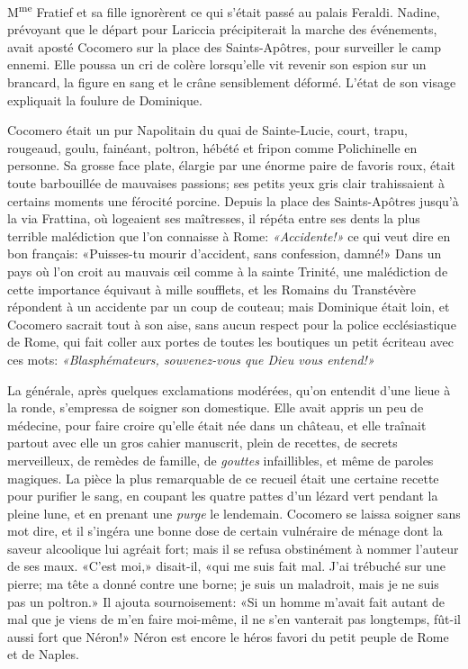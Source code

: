
M\textsuperscript{me} Fratief et sa fille ignorèrent ce qui s'était
passé au palais Feraldi. Nadine, prévoyant que le départ pour Lariccia
précipiterait la marche des événements, avait aposté Cocomero sur la
place des Saints-Apôtres, pour surveiller le camp ennemi. Elle poussa un
cri de colère lorsqu'elle vit revenir son espion sur un brancard, la
figure en sang et le crâne sensiblement déformé. L'état de son visage
expliquait la foulure de Dominique.

Cocomero était un pur Napolitain du quai de Sainte-Lucie, court, trapu,
rougeaud, goulu, fainéant, poltron, hébété et fripon comme Polichinelle
en personne. Sa grosse face plate, élargie par une énorme paire de
favoris roux, était toute barbouillée de mauvaises passions; ses petits
yeux gris clair trahissaient à certains moments une férocité porcine.
Depuis la place des Saints-Apôtres jusqu'à la via Frattina, où logeaient
ses maîtresses, il répéta entre ses dents la plus terrible malédiction
que l'on connaisse à Rome: \emph{«Accidente!»} ce qui veut dire en bon
français: «Puisses-tu mourir d'accident, sans confession, damné!» Dans
un pays où l'on croit au mauvais œil comme à la sainte Trinité, une
malédiction de cette importance équivaut à mille soufflets, et les
Romains du Transtévère répondent à un accidente par un coup de couteau;
mais Dominique était loin, et Cocomero sacrait tout à son aise, sans
aucun respect pour la police ecclésiastique de Rome, qui fait coller aux
portes de toutes les boutiques un petit écriteau avec ces mots:
\emph{«Blasphémateurs, souvenez-vous que Dieu vous entend!»}

La générale, après quelques exclamations modérées, qu'on entendit d'une
lieue à la ronde, s'empressa de soigner son domestique. Elle avait
appris un peu de médecine, pour faire croire qu'elle était née dans un
château, et elle traînait partout avec elle un gros cahier manuscrit,
plein de recettes, de secrets merveilleux, de remèdes de famille, de
\emph{gouttes} infaillibles, et même de paroles magiques. La pièce la
plus remarquable de ce recueil était une certaine recette pour purifier
le sang, en coupant les quatre pattes d'un lézard vert pendant la pleine
lune, et en prenant une \emph{purge} le lendemain. Cocomero se laissa
soigner sans mot dire, et il s'ingéra une bonne dose de certain
vulnéraire de ménage dont la saveur alcoolique lui agréait fort; mais il
se refusa obstinément à nommer l'auteur de ses maux. «C'est moi,»
disait-il, «qui me suis fait mal. J'ai trébuché sur une pierre; ma tête
a donné contre une borne; je suis un maladroit, mais je ne suis pas un
poltron.» Il ajouta sournoisement: «Si un homme m'avait fait autant de
mal que je viens de m'en faire moi-même, il ne s'en vanterait pas
longtemps, fût-il aussi fort que Néron!» Néron est encore le héros
favori du petit peuple de Rome et de Naples.

